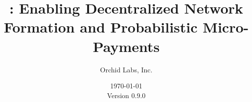 %
%


\title{\Orchid{}: Enabling Decentralized Network Formation and Probabilistic Micro-Payments}

\ifdefined\isdraft
  
\fi

%
%
 \author{Orchid Labs, Inc.}

%
%
\date{\today{} \\ Version 0.9.0}